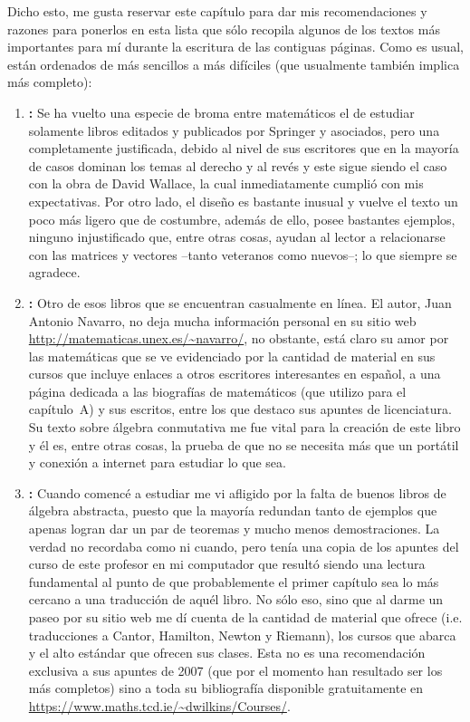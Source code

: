 \documentclass[11pt,oneside]{book}
\begin{document}
Dicho esto, me gusta reservar este capítulo para dar mis recomendaciones y razones para ponerlos en esta lista que sólo recopila algunos de los textos más importantes para mí durante la escritura de las contiguas páginas. Como es usual, están ordenados de más sencillos a más difíciles (que usualmente también implica más completo):
\begin{enumerate}[1.]
\item{\bfseries\cite{wallace1998groups}:} Se ha vuelto una especie de broma entre matemáticos el de estudiar solamente libros editados y publicados por Springer y asociados, pero una completamente justificada, debido al nivel de sus escritores que en la mayoría de casos dominan los temas al derecho y al revés y este sigue siendo el caso con la obra de David Wallace, la cual inmediatamente cumplió con mis expectativas. Por otro lado, el diseño es bastante inusual y vuelve el texto un poco más ligero que de costumbre, además de ello, posee bastantes ejemplos, ninguno injustificado que, entre otras cosas, ayudan al lector a relacionarse con las matrices y vectores --tanto veteranos como nuevos--; lo que siempre se agradece.
\item{\bfseries\cite{navarro2014algebra}:} Otro de esos libros que se encuentran casualmente en línea. El autor, Juan Antonio Navarro, no deja mucha información personal en su sitio web \url{http://matematicas.unex.es/~navarro/}, no obstante, está claro su amor por las matemáticas que se ve evidenciado por la cantidad de material en sus cursos que incluye enlaces a otros escritores interesantes en español, a una página dedicada a las biografías de matemáticos (que utilizo para el capítulo~A) y sus escritos, entre los que destaco sus apuntes de licenciatura. Su texto sobre álgebra conmutativa me fue vital para la creación de este libro y él es, entre otras cosas, la prueba de que no se necesita más que un portátil y conexión a internet para estudiar lo que sea.
\item{\bfseries\cite{wilkins2007abstract}:} Cuando comencé a estudiar me vi afligido por la falta de buenos libros de álgebra abstracta, puesto que la mayoría redundan tanto de ejemplos que apenas logran dar un par de teoremas y mucho menos demostraciones. La verdad no recordaba como ni cuando, pero tenía una copia de los apuntes del curso de este profesor en mi computador que resultó siendo una lectura fundamental al punto de que probablemente el primer capítulo sea lo más cercano a una traducción de aquél libro. No sólo eso, sino que al darme un paseo por su sitio web me dí cuenta de la cantidad de material que ofrece (i.e. traducciones a Cantor, Hamilton, Newton y Riemann), los cursos que abarca y el alto estándar que ofrecen sus clases. Esta no es una recomendación exclusiva a sus apuntes de 2007 (que por el momento han resultado ser los más completos) sino a toda su bibliografía disponible gratuitamente en \url{https://www.maths.tcd.ie/~dwilkins/Courses/}.

\end{enumerate}
\end{document}
